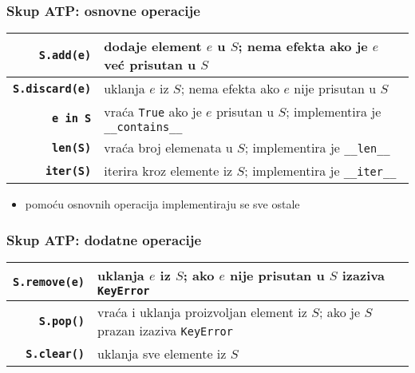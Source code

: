 \documentclass[compress]{beamer}
\begin{document}
\begin{frame}[fragile]
  \frametitle{Skup ATP: osnovne operacije}
  \begin{center}
    \begin{tabular}{rp{8cm}}
      \textbf{\texttt{S.add(e)}} & dodaje element $e$ u $S$; nema efekta ako je $e$ već prisutan u $S$\\ \hline
      \textbf{\texttt{S.discard(e)}} & uklanja $e$ iz $S$; nema efekta ako $e$ nije prisutan u $S$\\ \hline
      \textbf{\texttt{e in S}} & vraća \texttt{True} ako je $e$ prisutan u $S$; implementira je \texttt{\_\_contains\_\_} \\ \hline
      \textbf{\texttt{len(S)}} & vraća broj elemenata u $S$; implementira je \texttt{\_\_len\_\_} \\ \hline
      \textbf{\texttt{iter(S)}} & iterira kroz elemente iz $S$; implementira je \texttt{\_\_iter\_\_} \\
    \end{tabular}
  \end{center}
  \begin{itemize}
    \item pomoću osnovnih operacija implementiraju se sve ostale
  \end{itemize}
\end{frame}

\begin{frame}[fragile]
  \frametitle{Skup ATP: dodatne operacije}
  \begin{center}
    \begin{tabular}{rp{8cm}}
      \textbf{\texttt{S.remove(e)}} & uklanja $e$ iz $S$; ako $e$ nije prisutan u $S$ izaziva \texttt{KeyError}\\ \hline
      \textbf{\texttt{S.pop()}} & vraća i uklanja proizvoljan element iz $S$; ako je $S$ prazan izaziva \texttt{KeyError}\\ \hline
      \textbf{\texttt{S.clear()}} & uklanja sve elemente iz $S$ \\
    \end{tabular}
  \end{center}
\end{frame}
\end{document}

